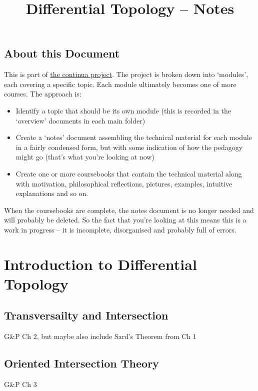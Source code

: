 \documentclass[oneside,english]{amsbook}
\numberwithin{section}{chapter}
\theoremstyle{plain}
\theoremstyle{definition}
\begin{document}
	
	\title{Differential Topology -- Notes}
	
	\maketitle
	
	\tableofcontents
	
	\chapter*{About this Document}
	
	This is part of \href{https://github.com/FineArtMaths/continua}{the continua project}. The project is broken down into `modules', each covering a specific topic. Each module ultimately becomes one of more courses. The approach is:
	
	\begin{itemize}
		\item{Identify a topic that should be its own module (this is recorded in the `overview' documents in each main folder)}
		\item{Create a `notes' document assembling the technical material for each module in a fairly condensed form, but with some indication of how the pedagogy might go (that's what you're looking at now)}
		\item{Create one or more coursebooks that contain the technical material along with motivation, philosophical reflections, pictures, examples, intuitive explanations and so on.}
	\end{itemize}
	
	When the coursebooks are complete, the notes document is no longer needed and will probably be deleted. So the fact that you're looking at this means this is a work in progress -- it is incomplete, disorganised and probably full of errors.
	
	\part{Introduction to Differential Topology}
	
	\chapter{Transversailty and Intersection}
		G\&P Ch 2, but maybe also include Sard's Theorem from Ch 1
	
	\chapter{Oriented Intersection Theory}
		G\&P Ch 3
	
\end{document}
